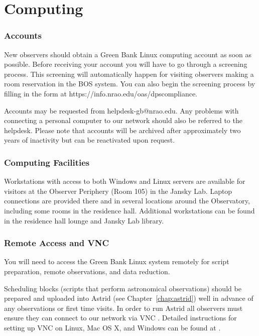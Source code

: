 \chapter{Computing}\label{chap:computing}

\subsection{Accounts}
New observers should obtain a Green Bank Linux computing account as soon as possible.
Before receiving your account you will have to go through a screening process.
This screening will automatically happen for visiting observers making a
room reservation in the BOS system.  You can also begin the screening
process by filling in the form at
{https://info.nrao.edu/oas/dpscompliance}.

Accounts may be requested from helpdesk-gb@nrao.edu.
Any problems with connecting a personal computer to our network should also
be referred to the helpdesk.
Please note that accounts will be archived after approximately two years of
inactivity but can be reactivated upon request.

\subsection{Computing Facilities}
Workstations with access to both Windows and Linux servers are available
for visitors at the Observer Periphery (Room 105) in the Jansky Lab.
Laptop connections are provided there and in several locations around the
Observatory, including some rooms in the residence hall.  Additional
workstations can be found in the residence hall lounge and Jansky Lab library.

\subsection{Remote Access and VNC}

You will need to access the Green Bank Linux system remotely
for script preparation, remote observations, and data reduction.

Scheduling blocks (scripts that perform astronomical observations)
should be prepared and uploaded into \gls{Astrid} (see Chapter~\ref{chap:astrid})
well in advance of any observations or first
time visits.  In order to run Astrid all observers must ensure they can connect
to our network via \gls{VNC} .  Detailed instructions
for setting up \gls{VNC} on Linux, Mac OS X, and Windows can be found at
.

